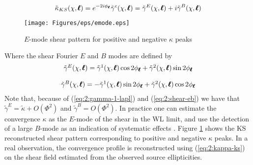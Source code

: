 \begin{equation}
\label{eq:2:kappa-ks}
\tilde{\kappa}_{KS}(\chi,\pmb{\ell}) = e^{-2i\phi_{\pmb{\ell}}} \tilde{\gamma}^c(\chi,\pmb{\ell}) = \tilde{\gamma}^E(\chi,\pmb{\ell}) + i\tilde{\gamma}^B(\chi,\pmb{\ell})
\end{equation}
%
\begin{figure}
\begin{center}
\texttt{[image: Figures/eps/emode.eps]}
\end{center}
\caption{$E$-mode shear pattern for positive and negative $\kappa$ peaks}
\label{fig:2:emode}
\end{figure}
%
Where the shear Fourier $E$ and $B$ modes are defined by
\begin{equation}
\label{eq:2:shear-eb}
\begin{matrix}
\tilde{\gamma}^E(\chi,\pmb{\ell}) =  \tilde{\gamma}^1(\chi,\pmb{\ell})\cos 2\phi_{\pmb{\ell}} +  \tilde{\gamma}^2(\chi,\pmb{\ell}) \sin 2\phi_{\pmb{\ell}}\\ \\ 
\tilde{\gamma}^B(\chi,\pmb{\ell}) = - \tilde{\gamma}^1(\chi,\pmb{\ell})\sin 2\phi_{\pmb{\ell}} + \tilde{\gamma}^2(\chi,\pmb{\ell}) \cos 2\phi_{\pmb{\ell}}
\end{matrix}
\end{equation}
%
Note that, because of (\ref{eq:2:gamma-1-lapl}) and (\ref{eq:2:shear-eb}) we have that $\tilde{\gamma}^E=\tilde{\kappa}+O(\Phi^2)$ and $\tilde{\gamma}^B=O(\Phi^2)$. In practice one can estimate the convergence $\kappa$ as the $E$-mode of the shear in the WL limit, and use the detection of a large $B$-mode as an indication of systematic effects \citep{PetriSpShear}. Figure \ref{fig:2:emode} shows the KS reconstructed shear pattern corresponding to positive and negative $\kappa$ peaks. In a real observation, the convergence profile is reconstructed using (\ref{eq:2:kappa-ks}) on the shear field estimated from the observed source ellipticities.    

%